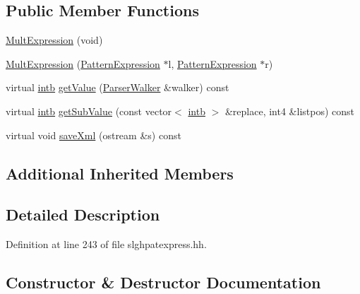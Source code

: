 \subsection*{Public Member Functions}
\begin{DoxyCompactItemize}
\item 
\mbox{\hyperlink{class_mult_expression_aa4ab9178ec57e9366cfc3a690d962df4}{Mult\+Expression}} (void)
\item 
\mbox{\hyperlink{class_mult_expression_a09975a44b26c041b2ea64c367b5f4e43}{Mult\+Expression}} (\mbox{\hyperlink{class_pattern_expression}{Pattern\+Expression}} $\ast$l, \mbox{\hyperlink{class_pattern_expression}{Pattern\+Expression}} $\ast$r)
\item 
virtual \mbox{\hyperlink{types_8h_aa925ba3e627c2df89d5b1cfe84fb8572}{intb}} \mbox{\hyperlink{class_mult_expression_a82c37f1e8c8b88955946f416619a861e}{get\+Value}} (\mbox{\hyperlink{class_parser_walker}{Parser\+Walker}} \&walker) const
\item 
virtual \mbox{\hyperlink{types_8h_aa925ba3e627c2df89d5b1cfe84fb8572}{intb}} \mbox{\hyperlink{class_mult_expression_ae435f0944f0ee57367618a778e341735}{get\+Sub\+Value}} (const vector$<$ \mbox{\hyperlink{types_8h_aa925ba3e627c2df89d5b1cfe84fb8572}{intb}} $>$ \&replace, int4 \&listpos) const
\item 
virtual void \mbox{\hyperlink{class_mult_expression_a98a416d51ae41bf94a6e211e310e6d53}{save\+Xml}} (ostream \&s) const
\end{DoxyCompactItemize}
\subsection*{Additional Inherited Members}


\subsection{Detailed Description}


Definition at line 243 of file slghpatexpress.\+hh.



\subsection{Constructor \& Destructor Documentation}
\mbox{\label{class_mult_expression_aa4ab9178ec57e9366cfc3a690d962df4}} 
